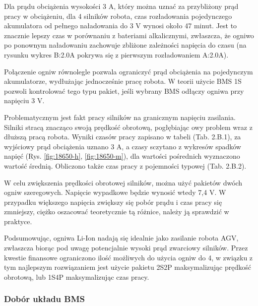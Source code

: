 \documentclass{report}
\begin{document}
\begin{enumerate}[label=(\Alph*)]
    Dla prądu obciążenia wysokości 3 A, który można uznać za przybliżony prąd pracy w obciążeniu, dla 4 silników robota, czas rozładowania pojedynczego akumulatora od pełnego naładowania do 3 V wynosi około 47 minut. Jest to znacznie lepszy czas w porównaniu z bateriami alkalicznymi, zwłaszcza, że ogniwo po ponownym naładowaniu zachowuje zbliżone zależności napięcia do czasu (na rysunku wykres B:2.0A pokrywa się z pierwszym rozładowaniem A:2.0A).
    
    Połączenie ogniw równolegle pozwala ograniczyć prąd obciążenia na pojedynczym akumulatorze, wydłużając jednocześnie pracę robota. W teorii użycie BMS 1S pozwoli kontrolować tego typu pakiet, jeśli wybrany BMS odłączy ogniwa przy napięciu 3 V. 
    
    Problematycznym jest fakt pracy silników na granicznym napięciu zasilania. Silniki stracą znacząco swoją prędkość obrotową, pogłębiając owy problem wraz z dłuższą pracą robota. Wyniki czasów pracy zapisano w tabeli (Tab. 2.B.1), za wyjściowy prąd obciążenia uznano 3 A, a czasy sczytano z wykresów spadków napięć (Rys. \ref{fig:18650-h}, \ref{fig:18650-m}), dla wartości pośrednich wyznaczono wartość średnią. Obliczono także czas pracy z pojemności typowej (Tab. 2.B.2).
     

    W celu zwiększenia prędkości obrotowej silników, można użyć pakietów dwóch ogniw szeregowych. Napięcie wypadkowe będzie wynosić wtedy 7,4 V.
    W przypadku większego napięcia zwiększy się pobór prądu i czas pracy się zmniejszy, ciężko oszacować teoretycznie tą różnice, należy ją sprawdzić w praktyce.
    
    Podsumowując, ogniwa Li-Ion nadają się idealnie jako zasilanie robota AGV, zwłaszcza biorąc pod uwagę potencjalnie wysoki prąd zwarciowy silników. Przez kwestie finansowe ograniczono ilość możliwych do użycia ogniw do 4, w związku z tym najlepszym rozwiązaniem jest użycie pakietu 2S2P maksymalizując prędkość obrotową, lub 1S4P maksymalizując czas pracy.
\end{enumerate}

\subsubsection{Dobór układu BMS}
\end{document}
